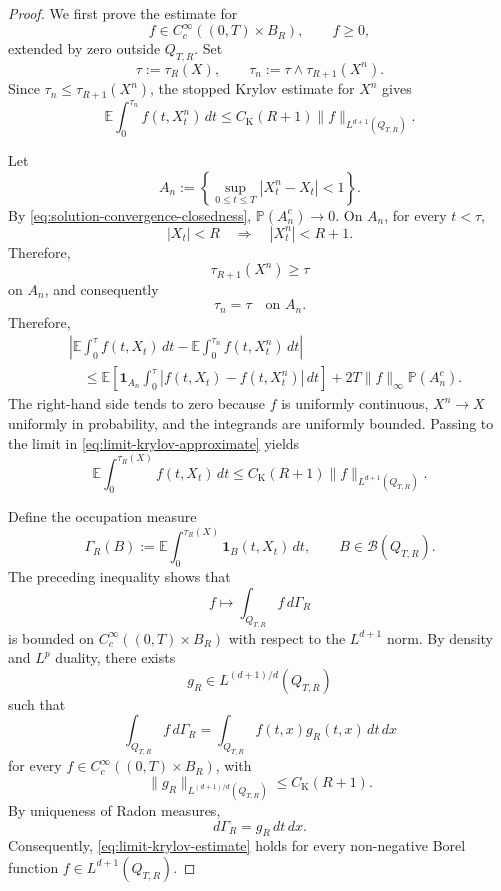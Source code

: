 \documentclass[12pt,oneside, reqno]{amsart}
\numberwithin{equation}{section}
\begin{document}
	\begin{proof}
		We first prove the estimate for
		\[
		f\in C_c^\infty((0,T)\times B_R),
		\qquad f\geq0,
		\]
		extended by zero outside $Q_{T,R}$. Set
		\[
		\tau:=\tau_R(X),
		\qquad
		\tau_n:=\tau\wedge\tau_{R+1}(X^n).
		\]
		Since $\tau_n\leq\tau_{R+1}(X^n)$, the stopped Krylov estimate for
		$X^n$ gives
		\begin{equation}
			\label{eq:limit-krylov-approximate}
			\mathbb E\int_0^{\tau_n}
			f(t,X_t^n)\,dt
			\leq
			C_{\mathrm K}(R+1)
			\|f\|_{L^{d+1}(Q_{T,R})}.
		\end{equation}
		
		Let
		\[
		A_n:=
		\left\{
		\sup_{0\leq t\leq T}|X_t^n-X_t|<1
		\right\}.
		\]
		By \eqref{eq:solution-convergence-closedness},
		$\mathbb P(A_n^c)\to0$. On $A_n$, for every $t<\tau$,
		\[
		|X_t|<R
		\quad\Longrightarrow\quad
		|X_t^n|<R+1.
		\]
		Therefore,
		\[
		\tau_{R+1}(X^n)\geq\tau
		\]
		on $A_n$, and consequently
		\begin{equation}
			\tau_n=\tau \quad\text{on }A_n.
		\end{equation}
		Therefore,
		\[
		\begin{aligned}
			&
			\left|
			\mathbb E\int_0^\tau f(t,X_t)\,dt
			-
			\mathbb E\int_0^{\tau_n}f(t,X_t^n)\,dt
			\right|
			\\
			&\quad\leq
			\mathbb E\left[
			\mathbf 1_{A_n}
			\int_0^\tau
			|f(t,X_t)-f(t,X_t^n)|\,dt
			\right]
			+
			2T\|f\|_\infty\mathbb P(A_n^c).
		\end{aligned}
		\]
		The right-hand side tends to zero because $f$ is uniformly continuous,
		$X^n\to X$ uniformly in probability, and the integrands are uniformly
		bounded. Passing to the limit in
		\eqref{eq:limit-krylov-approximate} yields
		\[
		\mathbb E\int_0^{\tau_R(X)}
		f(t,X_t)\,dt
		\leq
		C_{\mathrm K}(R+1)
		\|f\|_{L^{d+1}(Q_{T,R})}.
		\]
		
		Define the occupation measure
		\[
		\Gamma_R(B)
		:=
		\mathbb E\int_0^{\tau_R(X)}
		\mathbf 1_B(t,X_t)\,dt,
		\qquad
		B\in\mathcal B(Q_{T,R}).
		\]
		The preceding inequality shows that
		\[
		f\longmapsto\int_{Q_{T,R}}f\,d\Gamma_R
		\]
		is bounded on $C_c^\infty((0,T)\times B_R)$ with respect to the
		$L^{d+1}$ norm. By density and $L^p$ duality, there exists
		\[
		g_R\in L^{(d+1)/d}(Q_{T,R})
		\]
		such that
		\[
		\int_{Q_{T,R}}f\,d\Gamma_R
		=
		\int_{Q_{T,R}}f(t,x)g_R(t,x)\,dt\,dx
		\]
		for every $f\in C_c^\infty((0,T)\times B_R)$, with
		\[
		\|g_R\|_{L^{(d+1)/d}(Q_{T,R})}
		\leq
		C_{\mathrm K}(R+1).
		\]
		By uniqueness of Radon measures,
		\[
		d\Gamma_R=g_R\,dt\,dx.
		\]
		Consequently, \eqref{eq:limit-krylov-estimate} holds for every
		non-negative Borel function
		$f\in L^{d+1}(Q_{T,R})$.
	\end{proof}
	
\end{document}
